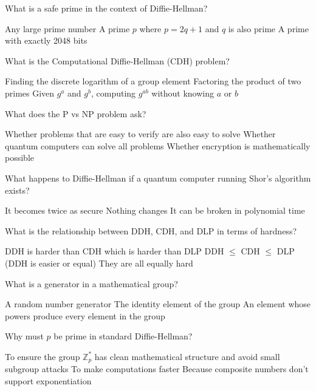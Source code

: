 \documentclass[10pt,a4paper,american]{exam}
\begin{document}
\begin{questions}
	\question What is a safe prime in the context of Diffie-Hellman?
	\begin{randomizechoices}
		\choice Any large prime number
		\CorrectChoice A prime $p$ where $p = 2q + 1$ and $q$ is also prime
		\choice A prime with exactly 2048 bits
	\end{randomizechoices}

	\question What is the Computational Diffie-Hellman (CDH) problem?
	\begin{randomizechoices}
		\choice Finding the discrete logarithm of a group element
		\choice Factoring the product of two primes
		\CorrectChoice Given $g^a$ and $g^b$, computing $g^{ab}$ without knowing $a$ or $b$
	\end{randomizechoices}

	\question What does the P vs NP problem ask?
	\begin{randomizechoices}
		\CorrectChoice Whether problems that are easy to verify are also easy to solve
		\choice Whether quantum computers can solve all problems
		\choice Whether encryption is mathematically possible
	\end{randomizechoices}

	\question What happens to Diffie-Hellman if a quantum computer running Shor's algorithm exists?
	\begin{randomizechoices}
		\choice It becomes twice as secure
		\choice Nothing changes
		\CorrectChoice It can be broken in polynomial time
	\end{randomizechoices}

	\question What is the relationship between DDH, CDH, and DLP in terms of hardness?
	\begin{randomizechoices}
		\choice DDH is harder than CDH which is harder than DLP
		\CorrectChoice DDH $\leq$ CDH $\leq$ DLP (DDH is easier or equal)
		\choice They are all equally hard
	\end{randomizechoices}

	\question What is a generator in a mathematical group?
	\begin{randomizechoices}
		\choice A random number generator
		\choice The identity element of the group
		\CorrectChoice An element whose powers produce every element in the group
	\end{randomizechoices}

	\question Why must $p$ be prime in standard Diffie-Hellman?
	\begin{randomizechoices}
		\CorrectChoice To ensure the group $\mathbb{Z}_p^*$ has clean mathematical structure and avoid small subgroup attacks
		\choice To make computations faster
		\choice Because composite numbers don't support exponentiation
	\end{randomizechoices}


\end{questions}
\end{document}
